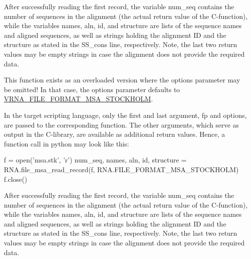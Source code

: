 \begin{DoxyRefList}
After successfully reading the first record, the variable {\ttfamily num\+\_\+seq} contains the number of sequences in the alignment (the actual return value of the C-\/function), while the variables {\ttfamily names}, {\ttfamily aln}, {\ttfamily id}, and {\ttfamily structure} are lists of the sequence names and aligned sequences, as well as strings holding the alignment ID and the structure as stated in the {\ttfamily S\+S\+\_\+cons} line, respectively. Note, the last two return values may be empty strings in case the alignment does not provide the required data.

This function exists as an overloaded version where the {\ttfamily options} parameter may be omitted! In that case, the {\ttfamily options} parameter defaults to \mbox{\hyperlink{group__file__utils_ga62be992445cd8ab2ad7a8fded944338b}{V\+R\+N\+A\+\_\+\+F\+I\+L\+E\+\_\+\+F\+O\+R\+M\+A\+T\+\_\+\+M\+S\+A\+\_\+\+S\+T\+O\+C\+K\+H\+O\+LM}}.  
\item[\label{wrappers__wrappers000061}%
\Hypertarget{wrappers__wrappers000061}%
Global \mbox{\hyperlink{group__file__utils_ga59204cd1daa4927f5127cc65a2886efd}{vrna\+\_\+file\+\_\+msa\+\_\+read\+\_\+record}} (F\+I\+LE $\ast$fp, char $\ast$$\ast$$\ast$names, char $\ast$$\ast$$\ast$aln, char $\ast$$\ast$id, char $\ast$$\ast$structure, unsigned int options)]In the target scripting language, only the first and last argument, {\ttfamily fp} and {\ttfamily options}, are passed to the corresponding function. The other arguments, which serve as output in the C-\/library, are available as additional return values. Hence, a function call in python may look like this\+:


\begin{DoxyCode}
f = open(\textcolor{stringliteral}{'msa.stk'}, \textcolor{charliteral}{'r'})
num\_seq, names, aln, \textcolor{keywordtype}{id}, structure = RNA.file\_msa\_read\_record(f, RNA.FILE\_FORMAT\_MSA\_STOCKHOLM)
f.close() 
\end{DoxyCode}


After successfully reading the first record, the variable {\ttfamily num\+\_\+seq} contains the number of sequences in the alignment (the actual return value of the C-\/function), while the variables {\ttfamily names}, {\ttfamily aln}, {\ttfamily id}, and {\ttfamily structure} are lists of the sequence names and aligned sequences, as well as strings holding the alignment ID and the structure as stated in the {\ttfamily S\+S\+\_\+cons} line, respectively. Note, the last two return values may be empty strings in case the alignment does not provide the required data.


\end{DoxyRefList}
